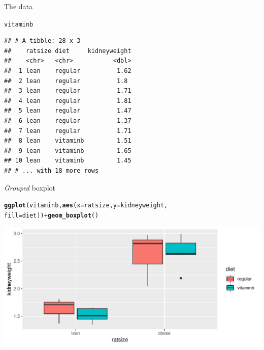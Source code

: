 \documentclass[unknownkeysallowed]{beamer}\usepackage[]{graphicx}\usepackage[]{color}
\makeatletter
\def\maxwidth{ %
  \ifdim\Gin@nat@width>\linewidth
    \linewidth
  \else
    \Gin@nat@width
  \fi
}
\newcommand{\hlopt}[1]{\textcolor[rgb]{0,0,0}{#1}}%
\newcommand{\hlstd}[1]{\textcolor[rgb]{0.345,0.345,0.345}{#1}}%
\newcommand{\hlkwc}[1]{\textcolor[rgb]{0.333,0.667,0.333}{#1}}%
\newcommand{\hlkwd}[1]{\textcolor[rgb]{0.737,0.353,0.396}{\textbf{#1}}}%
\newenvironment{kframe}{%
 \def\at@end@of@kframe{}%
 \ifinner\ifhmode%
  \def\at@end@of@kframe{\end{minipage}}%
  \begin{minipage}{\columnwidth}%
 \fi\fi%
 \def\FrameCommand##1{\hskip\@totalleftmargin \hskip-\fboxsep
 \colorbox{shadecolor}{##1}\hskip-\fboxsep
     \hskip-\linewidth \hskip-\@totalleftmargin \hskip\columnwidth}%
 \MakeFramed {\advance\hsize-\width
   \@totalleftmargin\z@ \linewidth\hsize
   \@setminipage}}%
 {\par\unskip\endMakeFramed%
 \at@end@of@kframe}
\newenvironment{knitrout}{}{} %
\makeatother
\begin{document}
\begin{frame}[fragile]{The data}
  
\begin{knitrout}
\color{fgcolor}\begin{kframe}
\begin{alltt}
\hlstd{vitaminb}
\end{alltt}
\begin{verbatim}
## # A tibble: 28 x 3
##    ratsize diet     kidneyweight
##    <chr>   <chr>           <dbl>
##  1 lean    regular          1.62
##  2 lean    regular          1.8 
##  3 lean    regular          1.71
##  4 lean    regular          1.81
##  5 lean    regular          1.47
##  6 lean    regular          1.37
##  7 lean    regular          1.71
##  8 lean    vitaminb         1.51
##  9 lean    vitaminb         1.65
## 10 lean    vitaminb         1.45
## # ... with 18 more rows
\end{verbatim}
\end{kframe}
\end{knitrout}
  
\end{frame}

\begin{frame}[fragile]{\emph{Grouped} boxplot}
  
\begin{knitrout}
\color{fgcolor}\begin{kframe}
\begin{alltt}
\hlkwd{ggplot}\hlstd{(vitaminb,}\hlkwd{aes}\hlstd{(}\hlkwc{x}\hlstd{=ratsize,}\hlkwc{y}\hlstd{=kidneyweight,}
                    \hlkwc{fill}\hlstd{=diet))}\hlopt{+}\hlkwd{geom_boxplot}\hlstd{()}
\end{alltt}
\end{kframe}
\includegraphics[width=\maxwidth]{figure/unnamed-chunk-163-1} 

\end{knitrout}
  
\end{frame}
\end{document}
